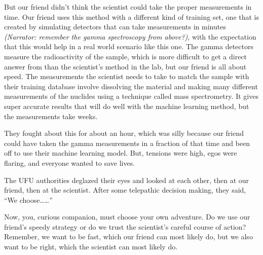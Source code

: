 {\begin{shadequote}
  But our friend didn't think the scientist could take the proper measurements
  in time. Our friend uses this method with a different kind of training set,
  one that is created by simulating detectors that can take measurements in
  minutes \textit{(Narrator: remember the gamma spectroscopy from above?)},
  with the expectation that this would help in a real world scenario like this
  one. The gamma detectors measure the radioactivity of the sample, which is
  more difficult to get a direct answer from than the scientist's method in the
  lab, but our friend is all about speed. The measurements the scientist needs
  to take to match the sample with their training database involve dissolving
  the material and making many different measurements of the nuclides using a
  technique called mass spectrometry\footnotemark[7].  It gives super accurate
  results that will do well with the machine learning method, but the
  measurements take weeks. 
  
  They fought about this for about an hour, which was silly because our friend
  could have taken the gamma measurements in a fraction of that time and been
  off to use their machine learning model. But, tensions were high, egos were
  flaring, and everyone wanted to save lives. 
  
  The UFU authorities deglazed their eyes and looked at each other, then at our
  friend, then at the scientist. After some telepathic decision making, they
  said, ``We choose\ldots\ldots''

\end{shadequote}

\narr Now, you, curious companion, must choose your own adventure. Do we use
our friend's speedy strategy or do we trust the scientist's careful course of
action? Remember, we want to be fast, which our friend can most likely do, but
we also want to be right, which the scientist can most likely do.

}

